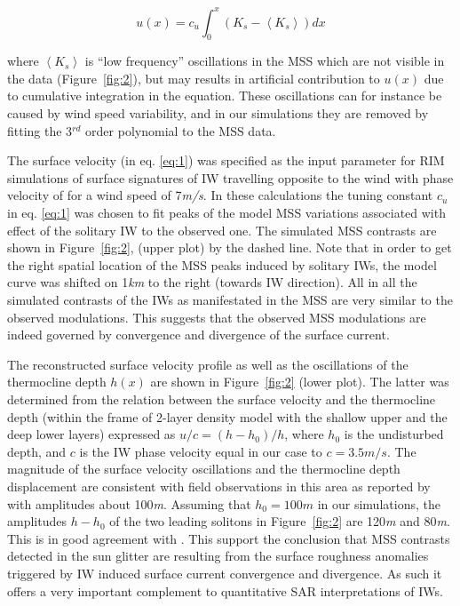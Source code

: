 \documentclass[preprint,authoryear,12pt]{elsarticle}
\begin{document}
\begin{equation}
u(x) = c_u \int_0^x \left( K_s - \left\langle K_s \right\rangle \right) dx
\label{eq:1}
\end{equation}

\noindent where $\left\langle K_s \right\rangle$ is ``low frequency'' oscillations in the MSS which are not visible in the data (Figure~\ref{fig:2}), but may results in artificial contribution to $u(x)$ due to cumulative integration in the equation.  These oscillations can for instance be caused by wind speed variability, and in our simulations they are removed by fitting the 3${}^{rd}$ order polynomial to the MSS data.  

The surface velocity (in eq. \eqref{eq:1}) was specified as the input parameter for RIM simulations of surface signatures of IW travelling opposite to the wind with phase velocity of  for a wind speed of 7\textit{m/s}. In these calculations the tuning constant $c_u$ in eq. \eqref{eq:1} was chosen to fit peaks of the model MSS variations associated with effect of the solitary IW to the observed one. The simulated MSS contrasts are shown in Figure~\ref{fig:2}, (upper plot) by the dashed line. Note that in order to get the right spatial location of the MSS peaks induced by solitary IWs, the model curve was shifted on 1\textit{km} to the right (towards IW direction). All in all the simulated contrasts of the IWs as manifestated in the MSS are very similar to the observed modulations. This suggests that the observed MSS modulations are indeed governed by convergence and divergence of the surface current.

The reconstructed surface velocity profile as well as the oscillations of the thermocline depth $h(x)$ are shown in Figure~\ref{fig:2} (lower plot). The latter was determined from the relation between the surface velocity and the thermocline depth (within the frame of 2-layer density model with the shallow upper and the deep lower layers) expressed as $u/c = \left( h-h_0 \right) / h $, where $h_0$ is the undisturbed depth, and $c$ is the IW phase velocity equal in our case to $c=3.5m/s$. The magnitude of the surface velocity oscillations and the thermocline depth displacement are consistent with field observations in this area as reported by \cite{Dulov1986} with amplitudes about 100\textit{m}. Assuming that $h_0 = 100m$ in our simulations, the amplitudes $h-h_0$ of the two leading solitons in Figure~\ref{fig:2} are 120\textit{m} and 80\textit{m}. This is in good agreement with \citep{Dulov1986}. This support the conclusion that MSS contrasts detected in the sun glitter are resulting from the surface roughness anomalies triggered by IW induced surface current convergence and divergence. As such it offers a very important complement to quantitative SAR interpretations of IWs.
\end{document}
